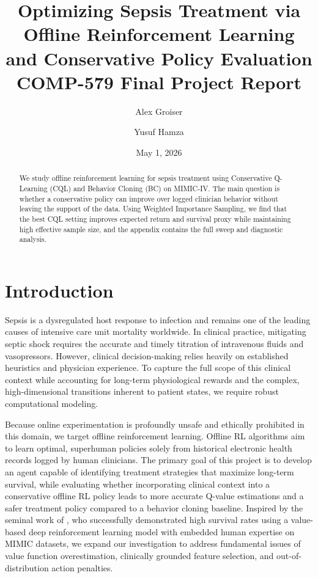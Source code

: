 \documentclass[11pt]{article}
\title{Optimizing Sepsis Treatment via Offline Reinforcement Learning and Conservative Policy Evaluation\\
\large COMP-579 Final Project Report}
\author{
  Alex Groiser \\
  \and
  Yusuf Hamza \\
}
\date{May 1, 2026}
\begin{document}
\maketitle

\begin{abstract}
We study offline reinforcement learning for sepsis treatment using Conservative Q-Learning (CQL) and Behavior Cloning (BC) on MIMIC-IV. The main question is whether a conservative policy can improve over logged clinician behavior without leaving the support of the data. Using Weighted Importance Sampling, we find that the best CQL setting improves expected return and survival proxy while maintaining high effective sample size, and the appendix contains the full sweep and diagnostic analysis.
\end{abstract}

\section{Introduction}
Sepsis is a dysregulated host response to infection and remains one of the leading causes of intensive care unit mortality worldwide. In clinical practice, mitigating septic shock requires the accurate and timely titration of intravenous fluids and vasopressors. However, clinical decision-making relies heavily on established heuristics and physician experience. To capture the full scope of this clinical context while accounting for long-term physiological rewards and the complex, high-dimensional transitions inherent to patient states, we require robust computational modeling. 

Because online experimentation is profoundly unsafe and ethically prohibited in this domain, we target offline reinforcement learning. Offline RL algorithms aim to learn optimal, superhuman policies solely from historical electronic health records logged by human clinicians. The primary goal of this project is to develop an agent capable of identifying treatment strategies that maximize long-term survival, while evaluating whether incorporating clinical context into a conservative offline RL policy leads to more accurate Q-value estimations and a safer treatment policy compared to a behavior cloning baseline. Inspired by the seminal work of \citet{wu2023}, who successfully demonstrated high survival rates using a value-based deep reinforcement learning model with embedded human expertise on MIMIC datasets, we expand our investigation to address fundamental issues of value function overestimation, clinically grounded feature selection, and out-of-distribution action penalties.
\end{document}
